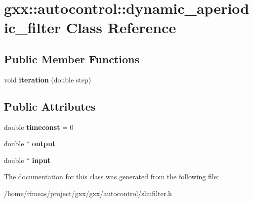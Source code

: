 \hypertarget{classgxx_1_1autocontrol_1_1dynamic__aperiodic__filter}{}\section{gxx\+:\+:autocontrol\+:\+:dynamic\+\_\+aperiodic\+\_\+filter Class Reference}
\label{classgxx_1_1autocontrol_1_1dynamic__aperiodic__filter}
\subsection*{Public Member Functions}
\begin{DoxyCompactItemize}
\item 
void {\bfseries iteration} (double step)\hypertarget{classgxx_1_1autocontrol_1_1dynamic__aperiodic__filter_a890bea696782b230826df1bacae29ff2}{}\label{classgxx_1_1autocontrol_1_1dynamic__aperiodic__filter_a890bea696782b230826df1bacae29ff2}

\end{DoxyCompactItemize}
\subsection*{Public Attributes}
\begin{DoxyCompactItemize}
\item 
double {\bfseries timeconst} = 0\hypertarget{classgxx_1_1autocontrol_1_1dynamic__aperiodic__filter_a9066a7c3edbb85b89fe75417a11ffbb7}{}\label{classgxx_1_1autocontrol_1_1dynamic__aperiodic__filter_a9066a7c3edbb85b89fe75417a11ffbb7}

\item 
double $\ast$ {\bfseries output}\hypertarget{classgxx_1_1autocontrol_1_1dynamic__aperiodic__filter_addb7c0bb3bd8f39eb20ee1164380e67d}{}\label{classgxx_1_1autocontrol_1_1dynamic__aperiodic__filter_addb7c0bb3bd8f39eb20ee1164380e67d}

\item 
double $\ast$ {\bfseries input}\hypertarget{classgxx_1_1autocontrol_1_1dynamic__aperiodic__filter_a6363c85f5662d09e54017a967c6eb356}{}\label{classgxx_1_1autocontrol_1_1dynamic__aperiodic__filter_a6363c85f5662d09e54017a967c6eb356}

\end{DoxyCompactItemize}


The documentation for this class was generated from the following file\+:\begin{DoxyCompactItemize}
\item 
/home/rfmeas/project/gxx/gxx/autocontrol/slinfilter.\+h\end{DoxyCompactItemize}
